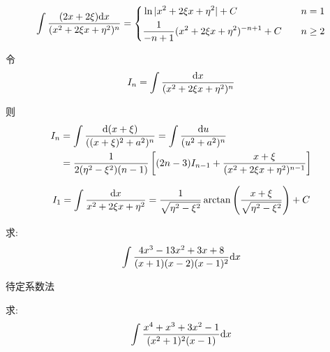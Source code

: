 \begin{equation*}
    \int\frac{(2x+2\xi)\mathrm{d} x}{(x^2+2\xi x+\eta^2)^n} = \left\{
        \begin{aligned}
            &\ln|x^2+2\xi x +\eta^2| + C & \quad n = 1 \\
            &\frac{1}{-n+1}(x^2+2\xi x + \eta^2)^{-n+1} + C & \quad n \ge 2
        \end{aligned}
    \right.
\end{equation*}

令
\begin{equation*}
    I_n = \int \frac{\mathrm{d} x}{(x^2+2\xi x + \eta^2)^n}
\end{equation*}

则
\begin{equation*}
    \begin{aligned}
        I_n &= \int \frac{\mathrm{d} (x+\xi)}{((x+\xi)^2+a^2)^n} = \int\frac{\mathrm{d} u}{(u^2+a^2)^n} \\
        &= \frac{1}{2(\eta^2-\xi^2)(n-1)}\left[(2n-3)I_{n-1}+\frac{x+\xi}{(x^2+2\xi x+\eta^2)^{n-1}}\right]
    \end{aligned}
\end{equation*}

\begin{equation*}
    I_1 = \int\frac{\mathrm{d} x}{x^2+2\xi x+\eta^2} = \frac{1}{\sqrt{\eta^2-\xi^2}}\arctan\left(\frac{x+\xi}{\sqrt{\eta^2-\xi^2}}\right) + C
\end{equation*}

\begin{example}
    求:
    \begin{equation*}
        \int \frac{4x^3-13x^2+3x+8}{(x+1)(x-2)(x-1)^2} \mathrm{d} x
    \end{equation*}
\end{example}
\begin{solution}
    
\end{solution}
\begin{remark}
    待定系数法
\end{remark}

\begin{example}
    求:
    \begin{equation*}
        \int \frac{x^4+x^3+3x^2-1}{(x^2+1)^2(x-1)} \mathrm{d} x
    \end{equation*}
\end{example}
\begin{solution}
    
\end{solution}

